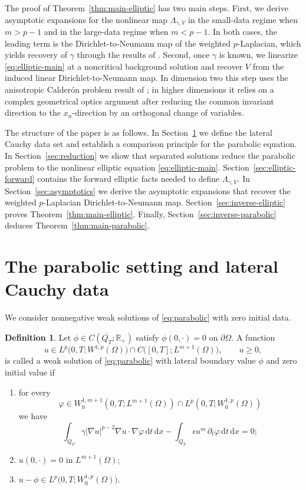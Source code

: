 \documentclass[a4paper,12pt]{article}
\newcommand{\pr}{\partial}
\newcommand{\R}{\mathbb{R}}
\newcommand{\dd}{\,\mathrm{d}}
\theoremstyle{definition}
\newtheorem{dfn}[thm]{Definition}
\theoremstyle{remark}
\begin{document}
The proof of Theorem~\ref{thm:main-elliptic} has two main steps. First, we derive asymptotic expansions for the nonlinear map $\Lambda_{\gamma,V}$ in the small-data regime when $m>p-1$ and in the large-data regime when $m<p-1$. In both cases, the leading term is the Dirichlet-to-Neumann map of the weighted $p$-Laplacian, which yields recovery of $\gamma$ through the  results of \cite{CarFe3}. Second, once $\gamma$ is known, we linearize \eqref{eq:elliptic-main} at a noncritical background solution and recover $V$ from the induced linear Dirichlet-to-Neumann map. In dimension two this step uses the anisotropic Calder\'on problem result  of \cite{CarLiiTzo}; in higher dimensions it relies on a complex geometrical optics argument after reducing the common invariant direction to the $x_n$-direction by an orthogonal change of variables.

The structure of the paper is as follows. In Section~\ref{sec:parabolic} we define the lateral Cauchy data set and establish a comparison principle for the parabolic equation. In Section~\ref{sec:reduction} we show that separated solutions reduce the parabolic problem to the nonlinear elliptic equation \eqref{eq:elliptic-main}. Section~\ref{sec:elliptic-forward} contains the forward elliptic facts needed to define $\Lambda_{\gamma,V}$. In Section~\ref{sec:asymptotics} we derive the asymptotic expansions that recover the weighted $p$-Laplacian Dirichlet-to-Neumann map. Section~\ref{sec:inverse-elliptic} proves Theorem~\ref{thm:main-elliptic}. Finally, Section~\ref{sec:inverse-parabolic} deduces Theorem~\ref{thm:main-parabolic}.

\section{The parabolic setting and lateral Cauchy data}\label{sec:parabolic}

We consider nonnegative weak solutions of \eqref{eq:parabolic} with zero initial data.

\begin{dfn}\label{def:weak-solution}
Let $\phi\in C(\overline{Q_T};\R_+)$ satisfy $\phi(0,\cdot)=0$ on $\pr\Omega$. A function
\[
u\in L^p\bigl(0,T;W^{1,p}(\Omega)\bigr)\cap C\bigl([0,T];L^{m+1}(\Omega)\bigr),\qquad u\ge 0,
\]
is called a weak solution of \eqref{eq:parabolic} with lateral boundary value $\phi$ and zero initial value if
\begin{enumerate}
\item for every
\[
\varphi\in W_0^{1,m+1}(0,T;L^{m+1}(\Omega))\cap L^p(0,T;W^{1,p}_0(\Omega))
\]
we have
\begin{equation}\label{eq:weak-parabolic}
\int_{Q_T}\gamma|\nabla u|^{p-2}\nabla u\cdot\nabla\varphi\dd t\dd x-
\int_{Q_T}\epsilon u^m\,\pr_t\varphi\dd t\dd x=0;
\end{equation}
\item $u(0,\cdot)=0$ in $L^{m+1}(\Omega)$;
\item $u-\phi\in L^p\bigl(0,T;W_0^{1,p}(\Omega)\bigr)$.
\end{enumerate}
\end{dfn}
\end{document}
